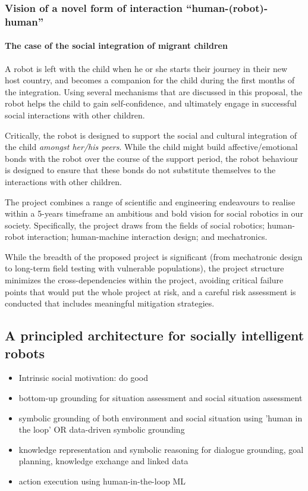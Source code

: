\documentclass[11pt]{article}
\begin{document}
\subsubsection{Vision of a novel form of interaction ``human-(robot)-human''}

\paragraph{The case of the social integration of migrant children}

A robot is left with the child when he or she starts their journey in
their new host country, and becomes a companion for the child during the
first months of the integration. Using several mechanisms that are
discussed in this proposal, the robot helps the child to gain
self-confidence, and ultimately engage in successful social interactions
with other children.

Critically, the robot is designed to support the social and cultural
integration of the child \emph{amongst her/his peers}. While the child
might build affective/emotional bonds with the robot over the course of
the support period, the robot behaviour is designed to ensure that these
bonds do not substitute themselves to the interactions with other
children.

The project combines a range of scientific and engineering endeavours to
realise within a 5-years timeframe an ambitious and bold vision for
social robotics in our society. Specifically, the project draws from the
fields of social robotics; human-robot interaction; human-machine
interaction design; and mechatronics.

While the breadth of the proposed project is significant (from
mechatronic design to long-term field testing with vulnerable
populations), the project structure minimizes the cross-dependencies
within the project, avoiding critical failure points that would put the
whole project at risk, and a careful risk assessment is conducted that
includes meaningful mitigation strategies.




\subsection{A principled architecture for socially intelligent robots}


\begin{itemize}
    \item Intrinsic social motivation: do good
    \item bottom-up grounding for situation assessment and social situation
        assessment
    \item symbolic grounding of both environment and social situation using
        'human in the loop' OR data-driven symbolic grounding
    \item knowledge representation and symbolic reasoning for dialogue
        grounding, goal planning, knowledge exchange and linked data
    \item action execution using human-in-the-loop ML
\end{itemize}
\end{document}
